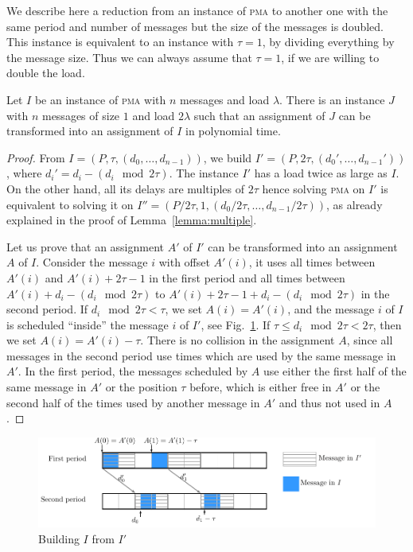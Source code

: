 \documentclass[a4paper,UKenglish,cleveref, autoref, thm-restate]{lipics-v2019}
\newcommand\pma{\textsc{pma}\xspace}
\begin{document}
We describe here a reduction from an instance of \pma to another one with the same period and number of messages but 
the size of the messages is doubled. This instance is equivalent to an instance with $\tau = 1$, by dividing everything by the message size. Thus we can always assume that $\tau = 1$, if we are willing to double the load.


\begin{theorem}\label{th:double_load}
Let $I$ be an instance of \pma with $n$ messages and load $\lambda$. There is an instance $J$ with $n$ messages of size $1$
and load $2\lambda$ such that an assignment of $J$ can be transformed into an assignment of $I$ in polynomial time.
\end{theorem}
\begin{proof}
From $I = (P,\tau,(d_{0},\dots,d_{n-1}))$, we build $I' = (P, 2\tau, (d_{0}',\dots,d_{n-1}'))$, where $d_i' = d_{i} - (d_{i} \mod 2\tau)$. The instance $I'$ has a load twice as large as $I$.
On the other hand, all its delays are multiples of $2\tau$ hence solving \pma on $I'$ is equivalent to solving it on $I'' = (P/2\tau, 1,(d_{0}/ 2\tau,\dots,d_{n-1} /2\tau))$, as already explained in the proof of Lemma~\ref{lemma:multiple}. 

Let us prove that an assignment $A'$ of $I'$ can be transformed into an assignment $A$ of $I$. 
Consider the message $i$ with offset $A'(i)$, it uses all times between $A'(i)$ and $A'(i) + 2\tau -1$ in the first period and all times between $A'(i) + d_{i} - (d_{i} \mod 2\tau)$ to $A'(i) + 2\tau -1+ d_{i} - (d_{i} \mod 2\tau)$ in the second period. 
If $d_{i} \mod 2\tau < \tau $, we set $A(i) = A'(i)$, and the message $i$ of $I$ is scheduled ``inside'' the 
message $i$ of $I'$, see Fig.~\ref{fig:transf_2tau}. If $\tau \leq d_{i} \mod 2\tau < 2\tau$, then we set 
$A(i) = A'(i) - \tau$. There is no collision in the assignment $A$, since all messages in the second period use
times which are used by the same message in $A'$. In the first period, the messages scheduled by $A$ use either the first
half of the same message in $A'$ or the position $\tau$ before, which is either free in $A'$ or the second half of the times used by another message in $A'$ and thus not used in $A$. 
\end{proof}
\begin{figure}[h]
\begin{center}

\includegraphics[scale=0.7]{transfo2tau}
\end{center}
\caption{Building $I$ from $I'$}
\label{fig:transf_2tau}
\end{figure}
\end{document}

